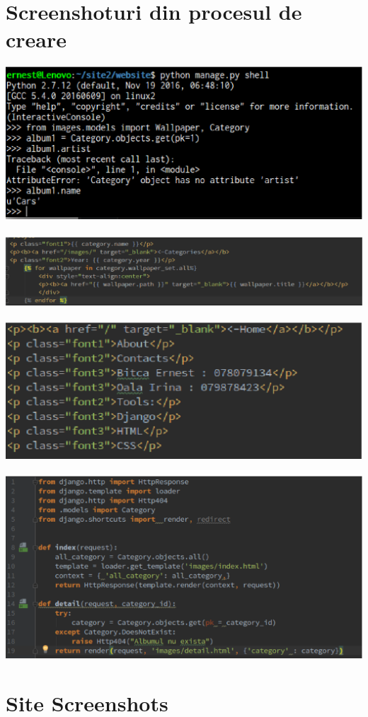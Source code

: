 \section{Screenshoturi din procesul de creare}
\includegraphics[width=\textwidth]{1.eps}
~\\
\includegraphics[width=\textwidth]{2.eps}
~\\
\includegraphics[width=\textwidth]{3.eps}
~\\
\includegraphics[width=\textwidth]{4.eps}
\clearpage
\section{Site Screenshots}

